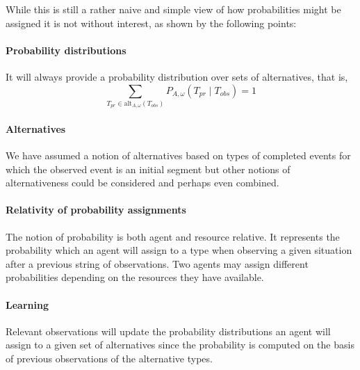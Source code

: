 While this is still a rather naive and simple view of how
probabilities might be assigned it is not without interest, as shown
by the following points:  
\paragraph{Probability distributions} It will always provide a probability distribution over sets
of alternatives, that is,
\[\sum\limits_{T_{\mathit{pr}}\in\mathrm{alt}_{A,\omega}(T_{\mathit{obs}})}P_{A,\omega}(T_{\mathit{pr}}\mid
T_{\mathit{obs}}) = 1\]
\paragraph{Alternatives} We have assumed a notion of alternatives based on types of completed
events for which the observed event is an initial segment but other
notions of alternativeness could be considered and perhaps even
combined.  
\paragraph{Relativity of probability assignments} The notion of
probability is both agent and resource relative.  It represents the
probability which an agent will assign to a type when observing a
given situation after a previous string of observations.  Two agents may assign different
probabilities depending on the resources they have available.
\paragraph{Learning} Relevant observations will update the probability
distributions an agent will assign to a given set of alternatives
since the probability is computed on the basis of previous
observations of the alternative types.

